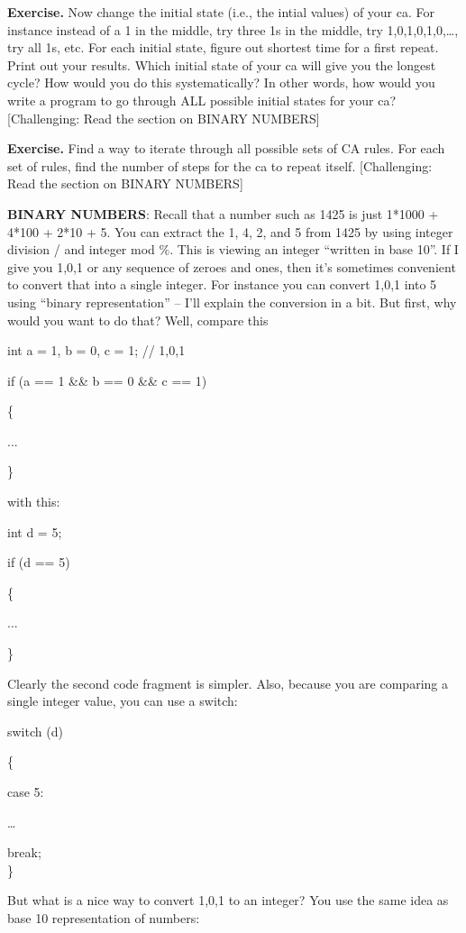 \documentclass[
]{article}
\begin{document}
\textbf{Exercise.} Now change the initial state (i.e., the intial
values) of your ca. For instance instead of a 1 in the middle, try three
1s in the middle, try 1,0,1,0,1,0,\ldots, try all 1s, etc. For each
initial state, figure out shortest time for a first repeat. Print out
your results. Which initial state of your ca will give you the longest
cycle? How would you do this systematically? In other words, how would
you write a program to go through ALL possible initial states for your
ca? {[}Challenging: Read the section on BINARY NUMBERS{]}

\textbf{Exercise.} Find a way to iterate through all possible sets of CA
rules. For each set of rules, find the number of steps for the ca to
repeat itself. {[}Challenging: Read the section on BINARY NUMBERS{]}

\textbf{BINARY NUMBERS}: Recall that a number such as 1425 is just
1*1000 + 4*100 + 2*10 + 5. You can extract the 1, 4, 2, and 5 from 1425
by using integer division / and integer mod \%. This is viewing an
integer ``written in base 10''. If I give you 1,0,1 or any sequence of
zeroes and ones, then it's sometimes convenient to convert that into a
single integer. For instance you can convert 1,0,1 into 5 using ``binary
representation'' -- I'll explain the conversion in a bit. But first, why
would you want to do that? Well, compare this

int a = 1, b = 0, c = 1; // 1,0,1

if (a == 1 \&\& b == 0 \&\& c == 1)

\{

...

\}

with this:

int d = 5;

if (d == 5)

\{

...

\}

Clearly the second code fragment is simpler. Also, because you are
comparing a single integer value, you can use a switch:

switch (d)

\{

case 5:

\ldots{}

break;\\
\}

But what is a nice way to convert 1,0,1 to an integer? You use the same
idea as base 10 representation of numbers:
\end{document}
